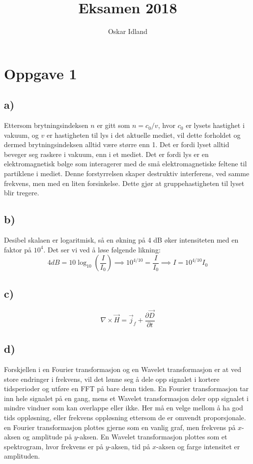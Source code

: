 \documentclass{article}
\author{Oskar Idland}
\title{Eksamen 2018}
\date{}
\begin{document}
\maketitle
\newpage

\section*{Oppgave 1}
  \subsection*{a)}
    Ettersom brytningsindeksen $n$ er gitt som $n = c_0 / v$, hvor $c_0$ er lysets hastighet i vakuum, og $v$ er hastigheten til lys i det aktuelle mediet, vil dette forholdet og dermed brytningsindeksen alltid være større enn 1. Det er fordi lyset alltid beveger seg raskere i vakuum, enn i et mediet. Det er fordi lys er en elektromagnetisk bølge som interagerer med de små elektromagnetiske feltene til partiklene i mediet. Denne forstyrrelsen skaper destruktiv interferens, ved samme frekvens, men med en liten forsinkelse. Dette gjør at gruppehastigheten til lyset blir tregere. 
    
  \subsection*{b)}
    Desibel skalaen er logaritmisk, så en økning på 4 dB øker intensiteten med en faktor på $10^{4}$. Det ser vi ved å løse følgende likning:
    \[
    4dB = 10 \log_{10} \left(\frac{I}{I_0}\right) \implies 10^{4/10} = \frac{I}{I_0} \implies I = 10^{4/10} I_0
    \]
  
  \subsection*{c)}
    \[
    ∇ × \vec{H} = \vec{j}_f + \frac{∂ \vec{D}}{∂ t}
    \]
    
  \subsection*{d)}
    Forskjellen i en Fourier transformasjon og en Wavelet transformasjon er at ved store endringer i frekvens, vil det lønne seg å dele opp signalet i kortere tidsperioder og utføre en FFT på bare denn tiden. En Fourier transformasjon tar inn hele signalet på en gang, mens et Wavelet transformasjon deler opp signalet i mindre vinduer som kan overlappe eller ikke. Her må en velge mellom å ha god tids oppløsning, eller frekvens oppløsning ettersom de er omvendt proporsjonale. en Fourier transformasjon plottes gjerne som en vanlig graf, men frekvens på $x$-aksen og amplitude på $y$-aksen.  En Wavelet transformasjon plottes som et spektrogram, hvor frekvens er på $y$-aksen, tid på $x$-aksen og farge intensitet er amplituden.
    
\end{document}
